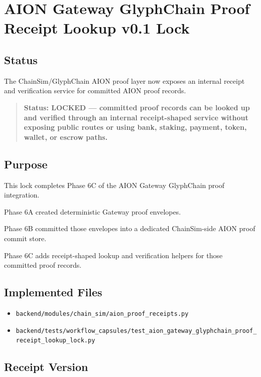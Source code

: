 \section{AION Gateway GlyphChain Proof Receipt Lookup v0.1 Lock}
\label{sec:aion-gateway-glyphchain-proof-receipt-lookup-lock}

\subsection{Status}

The ChainSim/GlyphChain AION proof layer now exposes an internal receipt and verification service for committed AION proof records.

\begin{quote}
\textbf{Status: LOCKED --- committed proof records can be looked up and verified through an internal receipt-shaped service without exposing public routes or using bank, staking, payment, token, wallet, or escrow paths.}
\end{quote}

\subsection{Purpose}

This lock completes Phase 6C of the AION Gateway GlyphChain proof integration.

Phase 6A created deterministic Gateway proof envelopes.

Phase 6B committed those envelopes into a dedicated ChainSim-side AION proof commit store.

Phase 6C adds receipt-shaped lookup and verification helpers for those committed proof records.

\subsection{Implemented Files}

\begin{itemize}
  \item \texttt{backend/modules/chain\_sim/aion\_proof\_receipts.py}
  \item \texttt{backend/tests/workflow\_capsules/test\_aion\_gateway\_glyphchain\_proof\_receipt\_lookup\_lock.py}
\end{itemize}

\subsection{Receipt Version}

